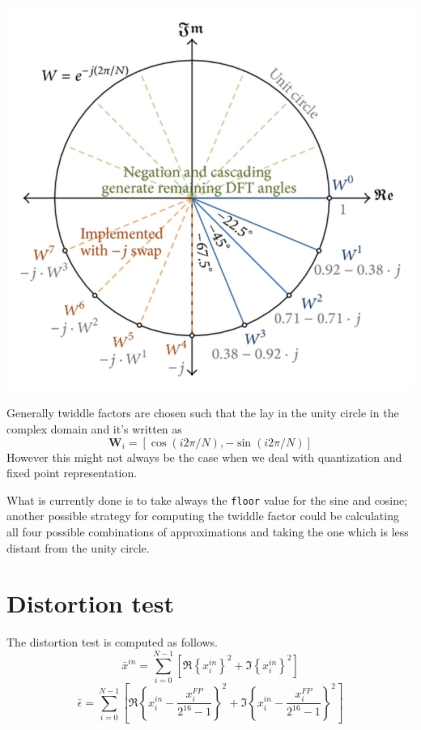 \documentclass[paper=a4, fontsize=12pt]{scrartcl} %
\numberwithin{equation}{section} %
\numberwithin{figure}{section} %
\numberwithin{table}{section} %
\begin{document}
\begin{minipage}{.4\textwidth}
\includegraphics[width = \textwidth]{fig1.jpg}
\end{minipage}
\hspace{.5cm}
\begin{minipage}{.6\textwidth}
Generally twiddle factors are chosen such that the lay in the unity circle in
the complex domain and it's written as
\begin{equation}
    \textbf{W}_i = \left[ \cos(i2\pi/N), -\sin(i2\pi/N) \right]
\end{equation}
However this might not always be the case when we deal with
quantization and fixed point representation.
\end{minipage}
What is currently done is to take always the \texttt{floor} value for the sine
and cosine; another possible strategy for computing the twiddle factor could be
calculating all four possible combinations of approximations and taking the one
which is less distant from the unity circle.

\section{Distortion test}
The distortion test is computed as follows.
\begin{equation}
    \bar x^{in} = \sum_{i=0}^{N-1}\left[ \Re\left\{ x^{in}_i \right\}^2 +
                                         \Im\left\{ x^{in}_i \right\}^2 \right]
\end{equation}
\begin{equation}
    \bar \epsilon = \sum_{i=0}^{N-1}\left[  \Re\left\{ x^{in}_i - \dfrac{x^{FP}_i}{2^{16}-1} \right\}^2 +
                                            \Im\left\{ x^{in}_i - \dfrac{x^{FP}_i}{2^{16}-1} \right\}^2 \right]
\end{equation}
\end{document}

